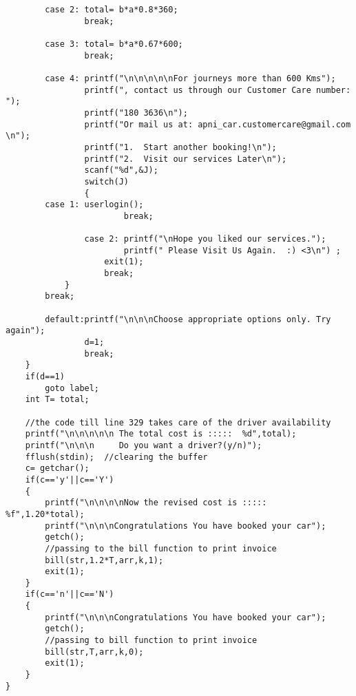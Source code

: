 \documentclass[12pt]{article}
\begin{document}
\begin{lstlisting}
        case 2: total= b*a*0.8*360;           
                break;

        case 3: total= b*a*0.67*600;
                break;

        case 4: printf("\n\n\n\n\nFor journeys more than 600 Kms"); 
                printf(", contact us through our Customer Care number: ");
                printf("180 3636\n");
                printf("Or mail us at: apni_car.customercare@gmail.com \n");
                printf("1.  Start another booking!\n");
                printf("2.  Visit our services Later\n");
                scanf("%d",&J);
                switch(J)
                {
		case 1: userlogin();
                        break;

                case 2: printf("\nHope you liked our services.");
                        printf(" Please Visit Us Again.  :) <3\n") ;
                	exit(1);
                	break;
	        }
		break;
        
        default:printf("\n\n\nChoose appropriate options only. Try again");
                d=1;
                break;
    }
    if(d==1)
    	goto label;
    int T= total;

    //the code till line 329 takes care of the driver availability
    printf("\n\n\n\n\n The total cost is :::::  %d",total);
    printf("\n\n\n     Do you want a driver?(y/n)");
    fflush(stdin);  //clearing the buffer
    c= getchar();
    if(c=='y'||c=='Y')
    {
        printf("\n\n\n\nNow the revised cost is :::::  %f",1.20*total);
        printf("\n\n\nCongratulations You have booked your car");
        getch();
        //passing to the bill function to print invoice
        bill(str,1.2*T,arr,k,1);
        exit(1);
    }
    if(c=='n'||c=='N')
    {
        printf("\n\n\nCongratulations You have booked your car");
        getch();
        //passing to bill function to print invoice
        bill(str,T,arr,k,0);
        exit(1);
    }
}


\end{lstlisting}
\end{document}
